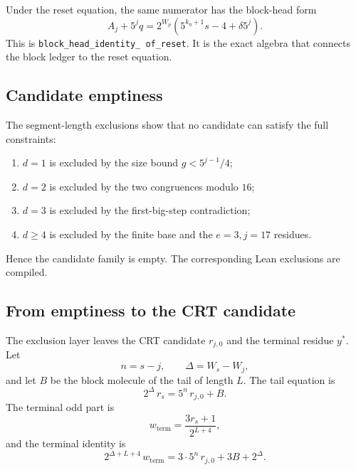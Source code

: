 Under the reset equation, the same numerator has the block-head form
\begin{equation*}
  A_j+5^jq
    =2^{W_p}\left(5^{k_0+1}s-4+\delta5^j\right).
\end{equation*}
This is \texttt{block\_\allowbreak head\_\allowbreak identity\_\allowbreak
of\_\allowbreak reset}.  It is the exact algebra that connects the
block ledger to the reset equation.

\subsection{Candidate emptiness}

The segment-length exclusions show that no candidate can satisfy the
full constraints:
\begin{enumerate}[leftmargin=*]
\item $d=1$ is excluded by the size bound $g<5^{j-1}/4$;
\item $d=2$ is excluded by the two congruences modulo $16$;
\item $d=3$ is excluded by the first-big-step contradiction;
\item $d\ge4$ is excluded by the finite base and the $e=3,j=17$
  residues.
\end{enumerate}
Hence the candidate family is empty.  The corresponding Lean
exclusions are compiled.

\subsection{From emptiness to the CRT candidate}

The exclusion layer leaves the CRT candidate $r_{j,0}$ and the
terminal residue $y^*$.  Let
\begin{equation*}
  n=s-j,\qquad \Delta=W_s-W_j,
\end{equation*}
and let $B$ be the block molecule of the tail of length $L$.  The tail
equation is
\begin{equation*}
  2^{\Delta}\,r_s=5^n\,r_{j,0}+B.
\end{equation*}
The terminal odd part is
\begin{equation*}
  w_{\mathrm{term}}=\frac{3r_s+1}{2^{L+4}},
\end{equation*}
and the terminal identity is
\begin{equation*}
  2^{\Delta+L+4}\,w_{\mathrm{term}}
    =3\cdot5^n\,r_{j,0}+3B+2^{\Delta}.
\end{equation*}

